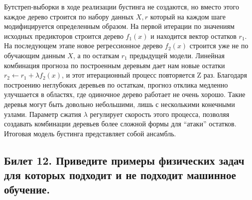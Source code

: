 \documentclass[a4paper, 12pt]{article}
\begin{document}
	Бутстреп-выборки в ходе реализации бустинга не создаются, но вместо этого каждое дерево строится по набору данных  $X,r$ который на каждом шаге модифицируется определенным образом. На первой итерации по значениям исходных предикторов строится дерево  $f_{1}(x)$ и находится вектор остатков  $r_{1}$. На последующем этапе новое регрессионное дерево  $f_{2}(x)$ строится уже не по обучающим данным $X$, а по остаткам $r_{1}$ предыдущей модели. Линейная комбинация прогноза по построенным деревьям дает нам новые остатки $r_{2}←r_{1}+\lambda f_{2}(x)$, и этот итерационный процесс повторяется Z раз. Благодаря построению неглубоких деревьев по остаткам, прогноз отклика медленно улучшается в областях, где одиночное дерево работает не очень хорошо. Такие деревья могут быть довольно небольшими, лишь с несколькими конечными узлами. Параметр сжатия $\lambda$ регулирует скорость этого процесса, позволяя создавать комбинации деревьев более сложной формы для “атаки” остатков. Итоговая модель бустинга представляет собой ансамбль.
	\subsection*{Билет 12.  Приведите примеры физических задач для которых подходит и не подходит машинное обучение.}
\end{document}
